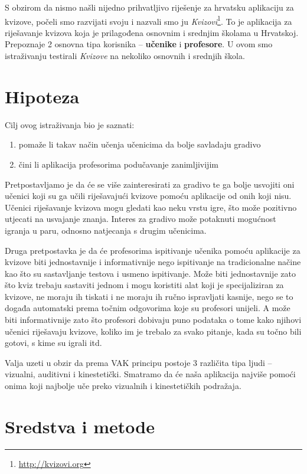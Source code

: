 \documentclass{scrreprt}
\begin{document}
S obzirom da nismo našli nijedno prihvatljivo riješenje za hrvatsku aplikaciju
za kvizove, počeli smo razvijati svoju i nazvali smo ju
\emph{Kvizovi}\footnote{\url{http://kvizovi.org}}. To je aplikacija za
riješavanje kvizova koja je prilagođena osnovnim i srednjim školama u Hrvatskoj.
Prepoznaje 2 osnovna tipa korisnika -- \textbf{učenike} i \textbf{profesore}. U
ovom smo istraživanju testirali \emph{Kvizove} na nekoliko osnovnih i srednjih
škola.

\chapter{Hipoteza}

Cilj ovog istraživanja bio je saznati:

\begin{enumerate}
  \item pomaže li takav način učenja učenicima da bolje savladaju gradivo
  \item čini li aplikacija profesorima podučavanje zanimljivijim
\end{enumerate}

Pretpostavljamo je da će se više zainteresirati za gradivo te ga bolje usvojiti
oni učenici koji su ga učili riješavajući kvizove pomoću aplikacije od onih koji
nisu. Učenici riješavanje kvizova mogu gledati kao neku vrstu igre, što može
pozitivno utjecati na usvajanje znanja. Interes za gradivo može potaknuti
mogućnost igranja u paru, odnosno natjecanja s drugim učenicima.

Druga pretpostavka je da će profesorima ispitivanje učenika pomoću aplikacije za
kvizove biti jednostavnije i informativnije nego ispitivanje na tradicionalne
načine kao što su sastavljanje testova i usmeno ispitivanje. Može biti
jednostavnije zato što kviz trebaju sastaviti jednom i mogu koristiti alat koji
je specijaliziran za kvizove, ne moraju ih tiskati i ne moraju ih ručno
ispravljati kasnije, nego se to događa automatski prema točnim odgovorima koje
su profesori unijeli. A može biti informativnije zato što profesori dobivaju
puno podataka o tome kako njihovi učenici riješavaju kvizove, koliko im je
trebalo za svako pitanje, kada su točno bili gotovi, s kime su igrali itd.

Valja uzeti u obzir da prema VAK principu postoje 3 različita tipa ljudi --
vizualni, auditivni i kinestetički.\cite{clark11} Smatramo da će naša aplikacija
najviše pomoći onima koji najbolje uče preko vizualnih i kinestetičkih
podražaja.

\chapter{Sredstva i metode}
\end{document}
